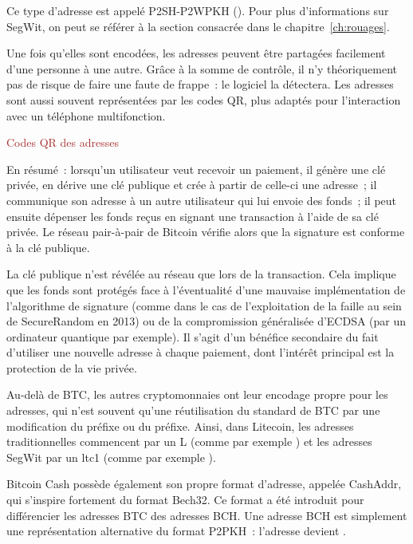 Ce type d'adresse est appelé P2SH-P2WPKH (). Pour plus d'informations sur SegWit, on peut se référer à la section consacrée dans le chapitre~\ref{ch:rouages}.

Une fois qu'elles sont encodées, les adresses peuvent être partagées facilement d'une personne à une autre. Grâce à la somme de contrôle, il n'y théoriquement pas de risque de faire une faute de frappe~: le logiciel la détectera. Les adresses sont aussi souvent représentées par les codes QR, plus adaptés pour l'interaction avec un téléphone multifonction.

\textcolor{brown}{Codes QR des adresses}

En résumé~: lorsqu'un utilisateur veut recevoir un paiement, il génère une clé privée, en dérive une clé publique et crée à partir de celle-ci une adresse~; il communique son adresse à un autre utilisateur qui lui envoie des fonds~; il peut ensuite dépenser les fonds reçus en signant une transaction à l'aide de sa clé privée. Le réseau pair-à-pair de Bitcoin vérifie alors que la signature est conforme à la clé publique. 

La clé publique n'est révélée au réseau que lors de la transaction. Cela implique que les fonds sont protégés face à l'éventualité d'une mauvaise implémentation de l'algorithme de signature (comme dans le cas de l'exploitation de la faille au sein de SecureRandom en 2013) ou de la compromission généralisée d'ECDSA (par un ordinateur quantique par exemple). Il s'agit d'un bénéfice secondaire du fait d'utiliser une nouvelle adresse à chaque paiement, dont l'intérêt principal est la protection de la vie privée.

Au-delà de BTC, les autres cryptomonnaies ont leur encodage propre pour les adresses, qui n'est souvent qu'une réutilisation du standard de BTC par une modification du préfixe ou du préfixe. Ainsi, dans Litecoin, les adresses traditionnelles commencent par un L (comme par exemple ) et les adresses SegWit par un ltc1 (comme par exemple ).

Bitcoin Cash possède également son propre format d'adresse, appelée CashAddr, qui s'inspire fortement du format Bech32. Ce format a été introduit pour différencier les adresses BTC des adresses BCH. Une adresse BCH est simplement une représentation alternative du format P2PKH~: l'adresse  devient .

